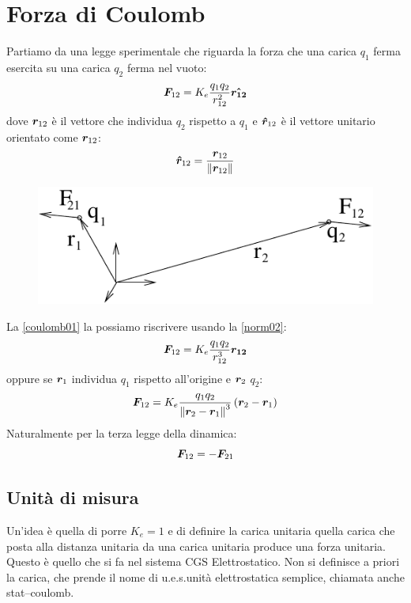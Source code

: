\section{Forza di Coulomb}
Partiamo da una legge sperimentale che riguarda la forza che una carica $q_1$ ferma esercita su una carica $q_2$ ferma nel vuoto:
\begin{equation}
\label{coulomb01}
\boldsymbol{F}_{12}=K_e\frac{q_1q_2}{r_{12}^2}\boldsymbol{\hat {r_{12}}}
\end{equation}
dove $\boldsymbol{r}_{12}$ è il vettore che individua $q_2$ rispetto a $q_1$ e $\boldsymbol{\hat {r}}_{12}$ è il vettore unitario orientato come $\boldsymbol{r}_{12}$:
\begin{equation}
\label{norm02}
\boldsymbol{\hat {r}}_{12}=\frac{\boldsymbol{r}_{12}}{\left\lVert\boldsymbol{r}_{12}\right\rVert}
\end{equation}

\begin{figure}[htbp]
\centering
\includegraphics[scale=1]{immagini/fisica2/forza_coulomb}
\end{figure}
La \eqref{coulomb01} la possiamo riscrivere usando la \eqref{norm02}:
\begin{equation*}\boldsymbol{F}_{12}=K_e\frac{q_1q_2}{r_{12}^3}\boldsymbol{r_{12}}\end{equation*}
oppure se $\boldsymbol{r}_1$ individua $q_1$ rispetto all'origine e $\boldsymbol{r}_2$ $q_2$:
\begin{equation*}
\boldsymbol{F}_{12}=K_e\frac{q_1q_2}{\left\lVert\boldsymbol{r}_2-\boldsymbol{r}_1\right\rVert^3}\left(\boldsymbol{r}_2-\boldsymbol{r}_1\right)
\end{equation*}
Naturalmente per la terza legge della dinamica:
\begin{equation*}
\boldsymbol{F}_{12}=-\boldsymbol{F}_{21}
\end{equation*}
\subsection{Unità di misura}
Un'idea è quella di porre $K_e=1$ e di definire la carica unitaria quella carica che posta alla distanza unitaria da una carica unitaria produce una forza unitaria. Questo è quello che si fa nel sistema CGS Elettrostatico. Non si definisce a priori la carica, che prende il nome di u.e.s.\@ unità elettrostatica semplice, chiamata anche stat--coulomb.

